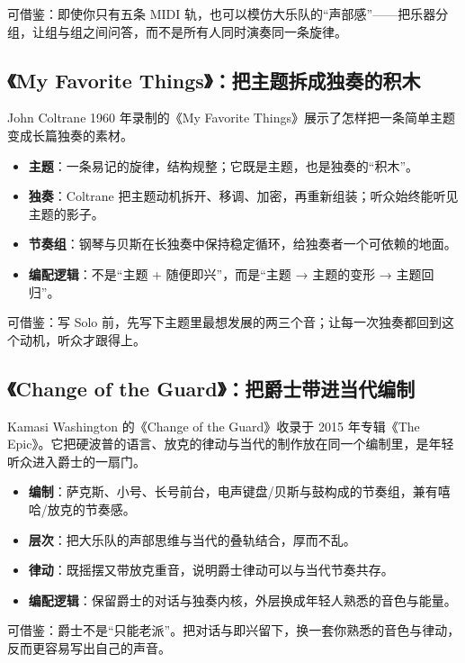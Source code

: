 可借鉴：即使你只有五条 MIDI 轨，也可以模仿大乐队的“声部感”——把乐器分组，让组与组之间问答，而不是所有人同时演奏同一条旋律。

\subsection{《My Favorite Things》：把主题拆成独奏的积木}
\label{sec:jazz-case-favorite-things}

John Coltrane 1960 年录制的《My Favorite Things》展示了怎样把一条简单主题变成长篇独奏的素材。

\begin{itemize}
\item \textbf{主题}：一条易记的旋律，结构规整；它既是主题，也是独奏的“积木”。
\item \textbf{独奏}：Coltrane 把主题动机拆开、移调、加密，再重新组装；听众始终能听见主题的影子。
\item \textbf{节奏组}：钢琴与贝斯在长独奏中保持稳定循环，给独奏者一个可依赖的地面。
\item \textbf{编配逻辑}：不是“主题 + 随便即兴”，而是“主题 → 主题的变形 → 主题回归”。
\end{itemize}

可借鉴：写 Solo 前，先写下主题里最想发展的两三个音；让每一次独奏都回到这个动机，听众才跟得上。

\subsection{《Change of the Guard》：把爵士带进当代编制}
\label{sec:jazz-case-change-of-guard}

Kamasi Washington 的《Change of the Guard》收录于 2015 年专辑《The Epic》。它把硬波普的语言、放克的律动与当代的制作放在同一个编制里，是年轻听众进入爵士的一扇门。

\begin{itemize}
\item \textbf{编制}：萨克斯、小号、长号前台，电声键盘/贝斯与鼓构成的节奏组，兼有嘻哈/放克的节奏感。
\item \textbf{层次}：把大乐队的声部思维与当代的叠轨结合，厚而不乱。
\item \textbf{律动}：既摇摆又带放克重音，说明爵士律动可以与当代节奏共存。
\item \textbf{编配逻辑}：保留爵士的对话与独奏内核，外层换成年轻人熟悉的音色与能量。
\end{itemize}

可借鉴：爵士不是“只能老派”。把对话与即兴留下，换一套你熟悉的音色与律动，反而更容易写出自己的声音。

